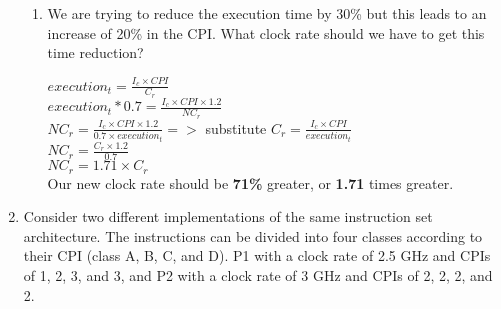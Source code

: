 \documentclass[10pt]{article}
\begin{document}
\begin{enumerate}
\begin{enumerate}
        \item We are trying to reduce the execution time by 30\% but this leads to an increase of 20\% in the CPI. What clock rate should we have to get this time reduction?
        \begin{center}
            $execution_t = \frac{I_c \times CPI}{C_r}$\\
            $execution_t * 0.7 = \frac{I_c \times CPI \times 1.2}{NC_r}$\\
            $NC_r = \frac{I_c \times CPI \times 1.2}{0.7 \times execution_t} =>$ substitute $C_r = \frac{I_c \times CPI}{execution_t}$\\
            $NC_r = \frac{C_r \times 1.2}{0.7}$\\
            $NC_r = 1.71 \times C_r$\\
            Our new clock rate should be \textbf{71\%} greater, or \textbf{1.71} times greater.
        \end{center}
    \end{enumerate}
    \item Consider two different implementations of the same instruction set architecture. The instructions can be divided into four classes according to their CPI (class A, B, C, and D). P1 with a clock rate of 2.5 GHz and CPIs of 1, 2, 3, and 3, and P2 with a clock rate of 3 GHz and CPIs of 2, 2, 2, and 2.


\end{enumerate}
\end{document}
